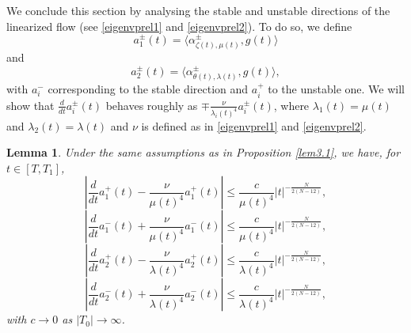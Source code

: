 \documentclass[a4paper,two-side,10pt]{amsart}
\newtheorem{lem}{Lemma}[section]
\numberwithin{equation}{section}
\begin{document}

We conclude this section by analysing the stable and unstable directions of the linearized flow (see \eqref{eigenvprel1} and \eqref{eigenvprel2}). To do so, we define \[
a_1^\pm (t)= \langle \alpha_{\zeta (t) , \mu (t)}^\pm , g(t) \rangle
\] 
and 
\[
a_2^\pm (t)= \langle \alpha_{\theta (t) , \lambda (t)}^\pm , g(t) \rangle,
\]  
with $a_i^-$ corresponding to the stable direction and $a_i^+$ to the unstable one. We will show that $\frac{d}{dt}a_i^\pm (t)$ behaves roughly as $\mp \frac{\nu}{\lambda_i (t)^4} a_i^\pm (t) $, where $\lambda_1 (t)=\mu (t)$ and $\lambda_2 (t)=\lambda (t)$ and $\nu$ is defined as in \eqref{eigenvprel1} and \eqref{eigenvprel2}. 













\begin{lem}
\label{lemmodeai}
Under the same assumptions as in Proposition \ref{lem3.1}, we have, for $t\in [T,T_1]$,
\begin{equation}
\label{stcoe1}
\left|\frac{d}{dt}a_1^+ (t) - \frac{\nu}{\mu (t)^4} a_1^+ (t)\right| \leq \frac{c}{\mu(t)^4} |t|^{-\frac{N}{2(N-12)}},
\end{equation}
\begin{equation}
\label{stcoe2}
\left|\frac{d}{dt}a_1^- (t) + \frac{\nu}{\mu (t)^4} a_1^- (t)\right| \leq \frac{c}{\mu(t)^4} |t|^{-\frac{N}{2(N-12)}},
\end{equation}
\begin{equation}
\label{stcoe3}
\left|\frac{d}{dt}a_2^+ (t) - \frac{\nu}{\lambda (t)^4} a_2^+ (t)\right| \leq \frac{c}{\lambda (t)^4} |t|^{-\frac{N}{2(N-12)}},
\end{equation}
\begin{equation}
\label{stcoe4}
\left|\frac{d}{dt}a_2^- (t) + \frac{\nu}{\lambda (t)^4} a_2^- (t)\right| \leq \frac{c}{\lambda (t)^4} |t|^{-\frac{N}{2(N-12)}},
\end{equation}
with $c\to 0$ as $|T_0|\to \infty$.


\end{lem}
\end{document}

